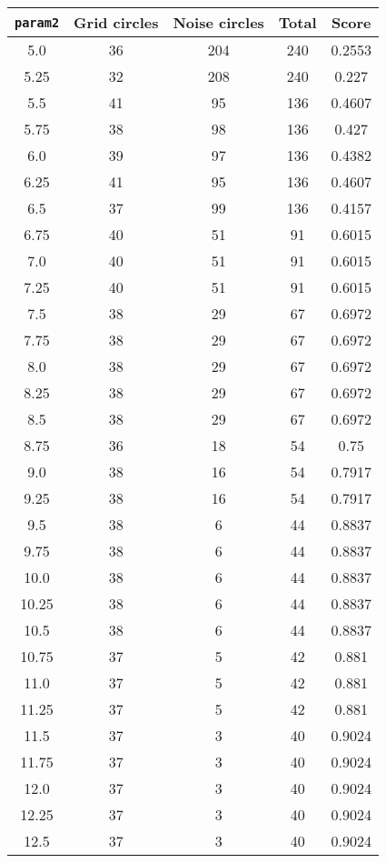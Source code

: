 \documentclass[letterpaper, 12pt]{article}
\begin{document}
\begin{longtable}{|c|c|c|c|c|}
\hline
\textbf{\texttt{param2}} & \textbf{Grid circles} & \textbf{Noise circles} & \textbf{Total} & \textbf{Score} \\
\hline
5.0 & 36 & 204 & 240 & 0.2553 \\
\hline
5.25 & 32 & 208 & 240 & 0.227 \\
\hline
5.5 & 41 & 95 & 136 & 0.4607 \\
\hline
5.75 & 38 & 98 & 136 & 0.427 \\
\hline
6.0 & 39 & 97 & 136 & 0.4382 \\
\hline
6.25 & 41 & 95 & 136 & 0.4607 \\
\hline
6.5 & 37 & 99 & 136 & 0.4157 \\
\hline
6.75 & 40 & 51 & 91 & 0.6015 \\
\hline
7.0 & 40 & 51 & 91 & 0.6015 \\
\hline
7.25 & 40 & 51 & 91 & 0.6015 \\
\hline
7.5 & 38 & 29 & 67 & 0.6972 \\
\hline
7.75 & 38 & 29 & 67 & 0.6972 \\
\hline
8.0 & 38 & 29 & 67 & 0.6972 \\
\hline
8.25 & 38 & 29 & 67 & 0.6972 \\
\hline
8.5 & 38 & 29 & 67 & 0.6972 \\
\hline
8.75 & 36 & 18 & 54 & 0.75 \\
\hline
9.0 & 38 & 16 & 54 & 0.7917 \\
\hline
9.25 & 38 & 16 & 54 & 0.7917 \\
\hline
9.5 & 38 & 6 & 44 & 0.8837 \\
\hline
9.75 & 38 & 6 & 44 & 0.8837 \\
\hline
10.0 & 38 & 6 & 44 & 0.8837 \\
\hline
10.25 & 38 & 6 & 44 & 0.8837 \\
\hline
10.5 & 38 & 6 & 44 & 0.8837 \\
\hline
10.75 & 37 & 5 & 42 & 0.881 \\
\hline
11.0 & 37 & 5 & 42 & 0.881 \\
\hline
11.25 & 37 & 5 & 42 & 0.881 \\
\hline
11.5 & 37 & 3 & 40 & 0.9024 \\
\hline
11.75 & 37 & 3 & 40 & 0.9024 \\
\hline
12.0 & 37 & 3 & 40 & 0.9024 \\
\hline
12.25 & 37 & 3 & 40 & 0.9024 \\
\hline
12.5 & 37 & 3 & 40 & 0.9024 \\

\end{longtable}
\end{document}
